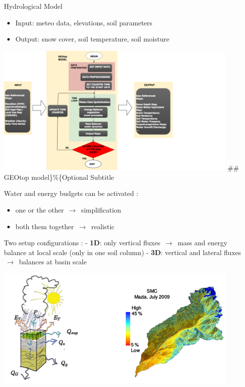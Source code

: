 \documentclass[ignorenonframetext,]{beamer}
\providecommand{\tightlist}{%
  \setlength{\itemsep}{0pt}\setlength{\parskip}{0pt}}
\begin{document}
\begin{frame}{Hydrological Model}
\protect\hypertarget{hydrological-model}{}

\begin{itemize}
\tightlist
\item
  Input: meteo data, elevations, soil parameters
\item
  Output: snow cover, soil temperature, soil moisture
\end{itemize}

\includegraphics[width=0.9\textwidth,height=\textheight]{resources/images/geotop_revised.png}
\#\# GEOtop model\}\%\{Optional Subtitle

Water and energy budgets can be activated :

\begin{itemize}
\tightlist
\item
  one or the other \(\,\to\,\) simplification
\item
  both them together \(\,\to\,\) realistic
\end{itemize}

Two setup configurations : - \textbf{1D}: only vertical fluxes
\(\,\to\,\) mass and energy balance at local scale (only in one soil
column) - \textbf{3D}: vertical and lateral fluxes \(\,\to\,\) balances
at basin scale

\includegraphics[width=0.9\textwidth,height=\textheight]{resources/images/geotop_ET_SWC.png}


\end{frame}
\end{document}
